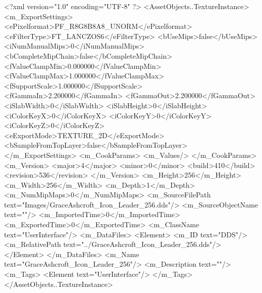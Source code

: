 <?xml version="1.0" encoding="UTF-8" ?>
<AssetObjects..TextureInstance>
	<m_ExportSettings>
		<ePixelformat>PF_R8G8B8A8_UNORM</ePixelformat>
		<eFilterType>FT_LANCZOS6</eFilterType>
		<bUseMips>false</bUseMips>
		<iNumManualMips>0</iNumManualMips>
		<bCompleteMipChain>false</bCompleteMipChain>
		<fValueClampMin>0.000000</fValueClampMin>
		<fValueClampMax>1.000000</fValueClampMax>
		<fSupportScale>1.000000</fSupportScale>
		<fGammaIn>2.200000</fGammaIn>
		<fGammaOut>2.200000</fGammaOut>
		<iSlabWidth>0</iSlabWidth>
		<iSlabHeight>0</iSlabHeight>
		<iColorKeyX>0</iColorKeyX>
		<iColorKeyY>0</iColorKeyY>
		<iColorKeyZ>0</iColorKeyZ>
		<eExportMode>TEXTURE_2D</eExportMode>
		<bSampleFromTopLayer>false</bSampleFromTopLayer>
	</m_ExportSettings>
	<m_CookParams>
		<m_Values/>
	</m_CookParams>
	<m_Version>
		<major>4</major>
		<minor>0</minor>
		<build>410</build>
		<revision>536</revision>
	</m_Version>
	<m_Height>256</m_Height>
	<m_Width>256</m_Width>
	<m_Depth>1</m_Depth>
	<m_NumMipMaps>0</m_NumMipMaps>
	<m_SourceFilePath text="Images/GraceAshcroft_Icon_Leader_256.dds"/>
	<m_SourceObjectName text=""/>
	<m_ImportedTime>0</m_ImportedTime>
	<m_ExportedTime>0</m_ExportedTime>
	<m_ClassName text="UserInterface"/>
	<m_DataFiles>
		<Element>
			<m_ID text="DDS"/>
			<m_RelativePath text="../GraceAshcroft_Icon_Leader_256.dds"/>
		</Element>
	</m_DataFiles>
	<m_Name text="GraceAshcroft_Icon_Leader_256"/>
	<m_Description text=""/>
	<m_Tags>
		<Element text="UserInterface"/>
	</m_Tags>
</AssetObjects..TextureInstance>
